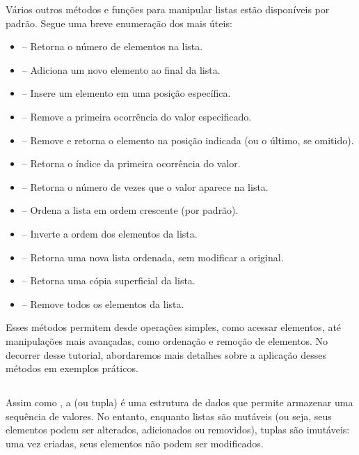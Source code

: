 Vários outros métodos e funções para manipular listas estão disponíveis por padrão. Segue uma breve enumeração dos mais úteis:
\begin{itemize}
\item {} – Retorna o número de elementos na lista.
\item {} – Adiciona um novo elemento ao final da lista.
\item {} – Insere um elemento em uma posição específica.
\item {} – Remove a primeira ocorrência do valor especificado.
\item {} – Remove e retorna o elemento na posição indicada (ou o último, se omitido).
\item {} – Retorna o índice da primeira ocorrência do valor.
\item {} – Retorna o número de vezes que o valor aparece na lista.
\item {} – Ordena a lista em ordem crescente (por padrão).
\item {} – Inverte a ordem dos elementos da lista.
\item {} – Retorna uma nova lista ordenada, sem modificar a original.
\item {} – Retorna uma cópia superficial da lista.
\item {} – Remove todos os elementos da lista.
\end{itemize}

Esses métodos permitem desde operações simples, como acessar elementos, até manipulações mais avançadas,
como ordenação e remoção de elementos.
No decorrer desse tutorial, abordaremos mais detalhes sobre a aplicação desses métodos em exemplos práticos.


\subsection{}

Assim como , a  (ou tupla) é uma estrutura de dados que permite armazenar uma sequência
de valores.
No entanto, enquanto listas são mutáveis (ou seja, seus elementos podem ser alterados, adicionados ou removidos),
tuplas são imutáveis: uma vez criadas, seus elementos não podem ser modificados.

